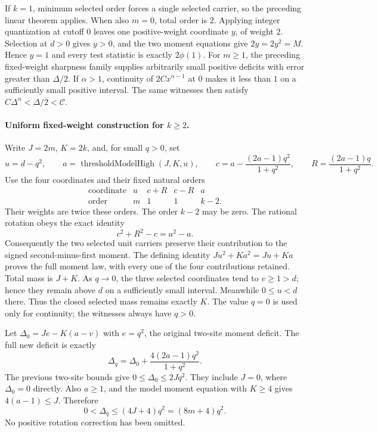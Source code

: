 If \(k=1\), minimum selected order forces a single selected carrier,
so the preceding linear theorem applies.  When also \(m=0\), total
order is \(2\).  Applying integer quantization at cutoff \(0\) leaves
one positive-weight coordinate \(y\), of weight \(2\).  Selection at
\(d>0\) gives \(y>0\), and the two moment equations give
\(2y=2y^2=M\).  Hence \(y=1\) and every test statistic is exactly
\(2\phi(1)\).  For \(m\geq1\), the preceding fixed-weight sharpness
family supplies arbitrarily small positive deficits with error
greater than \(\Delta/2\).
If \(\alpha>1\), continuity of
\(2C x^{\alpha-1}\) at \(0\) makes it less than \(1\) on a sufficiently
small positive interval.  The same witnesses then satisfy
\(C\Delta^\alpha<\Delta/2<\mathcal C\).

\paragraph{Uniform fixed-weight construction for \(k\geq2\).}
Write \(J=2m\), \(K=2k\), and, for small \(q>0\), set
\[
 u=d-q^2,\qquad a=\operatorname{thresholdModelHigh}(J,K,u),\qquad
 c=a-\frac{(2a-1)q^2}{1+q^2},\qquad
 R=\frac{(2a-1)q}{1+q^2}.
\]
Use the four coordinates and their fixed natural orders
\[
\begin{array}{c|cccc}
 \text{coordinate}&u&c+R&c-R&a\\
 \text{order}&m&1&1&k-2 .
\end{array}
\]
Their weights are twice these orders.  The order \(k-2\) may be zero.
The rational rotation obeys the exact identity
\[
 c^2+R^2-c=a^2-a.
\]
Consequently the two selected unit carriers preserve their contribution
to the signed second-minus-first moment.  The defining identity
\(Ju^2+Ka^2=Ju+Ka\) proves the full moment law, with every one of
the four contributions retained.  Total mass is \(J+K\).
As \(q\to0\), the three selected coordinates tend to \(v\geq1>d\);
hence they remain above \(d\) on a sufficiently small interval.
Meanwhile \(0\leq u<d\) there.  Thus the closed selected mass remains
exactly \(K\).  The value \(q=0\) is used only for continuity; the
witnesses always have \(q>0\).

Let \(\Delta_0=Je-K(a-v)\) with \(e=q^2\), the original two-site
moment deficit.  The full new deficit is exactly
\[
 \Delta_q=\Delta_0+
            \frac{4(2a-1)q^2}{1+q^2}.
\]
The previous two-site bounds give \(0\leq\Delta_0\leq2Jq^2\).
They include \(J=0\), where \(\Delta_0=0\) directly.
Also \(a\geq1\), and the model moment equation with \(K\geq4\)
gives \(4(a-1)\leq J\).  Therefore
\[
 0<\Delta_q\leq(4J+4)q^2=(8m+4)q^2.
\]
No positive rotation correction has been omitted.


